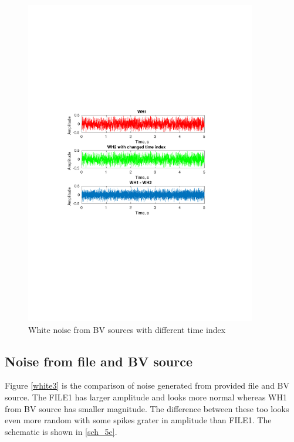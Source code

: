 \documentclass[12pt,a4paper,UKenglish]{article}
\begin{document}
\begin{figure} [H]
  \centering 
  \includegraphics[width=0.9\textwidth]{img/5b.pdf} 
  \caption{White noise from BV sources with different time index}
  \label{bv_white2} 
\end{figure}
\subsection{Noise from file and BV source}
Figure \ref{white3} is the comparison of noise generated from provided file and BV source. The FILE1 has larger amplitude and looks more normal whereas WH1 from BV source has smaller magnitude. The difference between these too looks even more random with some spikes grater in amplitude than FILE1. The schematic is shown in  \ref{sch_5c}. 
\end{document}
